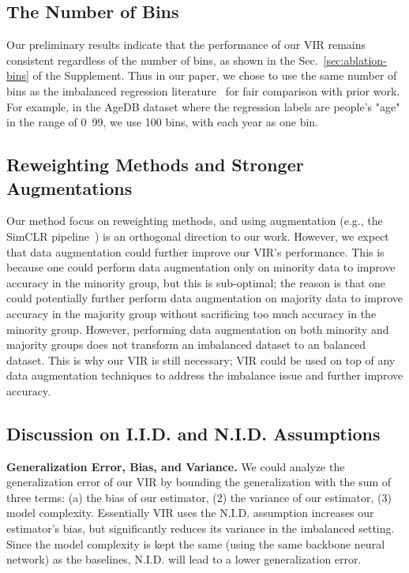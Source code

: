 \subsection{The Number of Bins}
{Our preliminary results indicate that the performance of our VIR remains consistent regardless of the number of bins, as shown in the Sec.~\ref{sec:ablation-bins} of the Supplement. Thus in our paper, we chose to use the same number of bins as the imbalanced regression literature~\citep{RankSim, DIR} for fair comparison with prior work. For example, in the AgeDB dataset where the regression labels are people's "age" in the range of 0~99, we use 100 bins, with each year as one bin.} 

\subsection{Reweighting Methods and Stronger Augmentations}
{Our method focus on reweighting methods, and using augmentation (e.g., the SimCLR pipeline~\citep{chen2020simple}) is an orthogonal direction to our work. However, we expect that data augmentation could further improve our VIR's performance. This is because one could perform data augmentation only on minority data to improve accuracy in the minority group, but this is sub-optimal; the reason is that one could potentially further perform data augmentation on majority data to improve accuracy in the majority group without sacrificing too much accuracy in the minority group. However, performing data augmentation on both minority and majority groups does not transform an imbalanced dataset to an balanced dataset. This is why our VIR is still necessary; VIR could be used on top of any data augmentation techniques to address the imbalance issue and further improve accuracy.}

\subsection{Discussion on I.I.D. and N.I.D. Assumptions}\label{sec:iid_nid}
%
{\textbf{Generalization Error, Bias, and Variance.} 
We could analyze the generalization error of our VIR by bounding the generalization with the sum of three terms: (a) the bias of our estimator, (2) the variance of our estimator, (3) model complexity. Essentially VIR uses the N.I.D. assumption increases our estimator's bias, but significantly reduces its variance in the imbalanced setting. Since the model complexity is kept the same (using the same backbone neural network) as the baselines, N.I.D. will lead to a lower generalization error.} 

